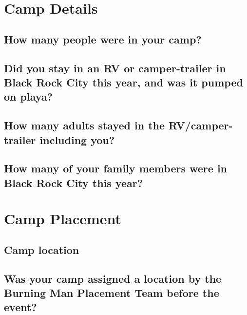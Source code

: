 \documentclass[
]{book}
\begin{document}
\hypertarget{camp-details}{%
\section{Camp Details}\label{camp-details}}

\hypertarget{how-many-people-were-in-your-camp}{%
\subsection{How many people were in your camp?}\label{how-many-people-were-in-your-camp}}

\hypertarget{did-you-stay-in-an-rv-or-camper-trailer-in-black-rock-city-this-year-and-was-it-pumped-on-playa}{%
\subsection{Did you stay in an RV or camper-trailer in Black Rock City this year, and was it pumped on playa?}\label{did-you-stay-in-an-rv-or-camper-trailer-in-black-rock-city-this-year-and-was-it-pumped-on-playa}}

\hypertarget{how-many-adults-stayed-in-the-rvcamper-trailer-including-you}{%
\subsection{How many adults stayed in the RV/camper-trailer including you?}\label{how-many-adults-stayed-in-the-rvcamper-trailer-including-you}}

\hypertarget{how-many-of-your-family-members-were-in-black-rock-city-this-year}{%
\subsection{How many of your family members were in Black Rock City this year?}\label{how-many-of-your-family-members-were-in-black-rock-city-this-year}}

\hypertarget{camp-placement}{%
\section{Camp Placement}\label{camp-placement}}

\hypertarget{camp-location}{%
\subsection{Camp location}\label{camp-location}}

\hypertarget{was-your-camp-assigned-a-location-by-the-burning-man-placement-team-before-the-event}{%
\subsection{Was your camp assigned a location by the Burning Man Placement Team before the event?}\label{was-your-camp-assigned-a-location-by-the-burning-man-placement-team-before-the-event}}
\end{document}
